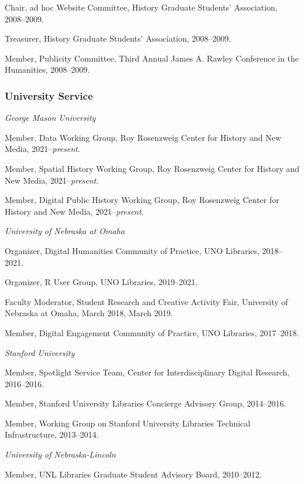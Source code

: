 Chair, ad hoc Website Committee, History Graduate Students' Association,
2008--2009.

Treasurer, History Graduate Students' Association, 2008--2009.

Member, Publicity Committee, Third Annual James A. Rawley Conference in
the Humanities, 2008--2009.

\subsubsection{University Service}\label{university-service}

\emph{George Mason University}

Member, Data Working Group, Roy Rosenzweig Center for History and New
Media, 2021--\emph{present}.

Member, Spatial History Working Group, Roy Rosenzweig Center for History
and New Media, 2021--\emph{present}.

Member, Digital Public History Working Group, Roy Rosenzweig Center for
History and New Media, 2021--\emph{present}.

\vspace{.4cm}

\emph{University of Nebraska at Omaha}

Organizer, Digital Humanities Community of Practice, UNO Libraries,
2018--2021.

Organizer, R User Group, UNO Libraries, 2019--2021.

Faculty Moderator, Student Research and Creative Activity Fair,
University of Nebraska at Omaha, March 2018, March 2019.

Member, Digital Engagement Community of Practice, UNO Libraries,
2017--2018.

\vspace{.4cm}

\emph{Stanford University}

Member, Spotlight Service Team, Center for Interdisciplinary Digital
Research, 2016--2016.

Member, Stanford University Libraries Concierge Advisory Group,
2014--2016.

Member, Working Group on Stanford University Libraries Technical
Infrastructure, 2013--2014.

\vspace{.4cm}

\emph{University of Nebraska-Lincoln}

Member, UNL Libraries Graduate Student Advisory Board, 2010--2012.


